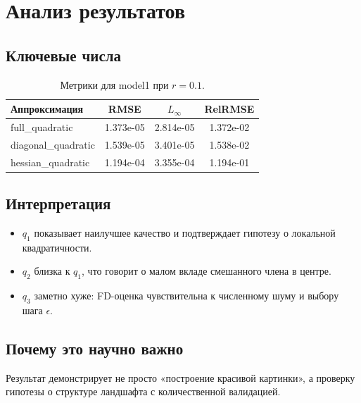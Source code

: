 \section{Анализ результатов}

\subsection{Ключевые числа}
\begin{table}[H]
\centering
\begin{tabular}{lccc}
\toprule
Аппроксимация & RMSE & $L_\infty$ & RelRMSE \\
\midrule
full\_quadratic & 1.373e-05 & 2.814e-05 & 1.372e-02 \\
diagonal\_quadratic & 1.539e-05 & 3.401e-05 & 1.538e-02 \\
hessian\_quadratic & 1.194e-04 & 3.355e-04 & 1.194e-01 \\
\bottomrule
\end{tabular}
\caption{Метрики для model1 при $r=0.1$.}
\label{tab:metrics_r01}
\end{table}

\subsection{Интерпретация}
\begin{itemize}
    \item $q_1$ показывает наилучшее качество и подтверждает гипотезу о локальной квадратичности.
    \item $q_2$ близка к $q_1$, что говорит о малом вкладе смешанного члена в центре.
    \item $q_3$ заметно хуже: FD-оценка чувствительна к численному шуму и выбору шага $\epsilon$.
\end{itemize}

\subsection{Почему это научно важно}
Результат демонстрирует не просто «построение красивой картинки», а проверку гипотезы о структуре ландшафта с количественной валидацией.

